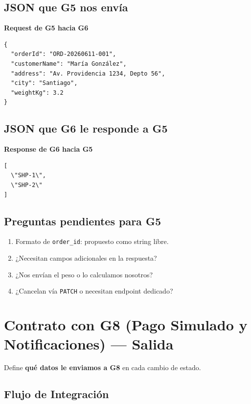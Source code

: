 \documentclass[11pt, a4paper]{article}
\newcommand{\contractheader}[1]{%
  \noindent\colorbox{primary!10}{%
    \parbox{\dimexpr\textwidth-2\fboxsep}{%
      \textbf{\faFileCode\quad #1}%
    }%
  }
  \vspace{0.3cm}
}
\begin{document}
\subsection{JSON que G5 nos envía}

\contractheader{Request de G5 hacia G6}

\begin{lstlisting}
{
  "orderId": "ORD-20260611-001",
  "customerName": "María González",
  "address": "Av. Providencia 1234, Depto 56",
  "city": "Santiago",
  "weightKg": 3.2
}
\end{lstlisting}

\subsection{JSON que G6 le responde a G5}

\contractheader{Response de G6 hacia G5}

\begin{lstlisting}
[
  \"SHP-1\",
  \"SHP-2\"
]
\end{lstlisting}

\subsection{Preguntas pendientes para G5}

\begin{warningbox}[title={\faExclamationCircle\quad Confirmar con G5}]
\begin{enumerate}[noitemsep]
  \item Formato de \texttt{order\_id}: propuesto como string libre.
  \item ¿Necesitan campos adicionales en la respuesta?
  \item ¿Nos envían el peso o lo calculamos nosotros?
  \item ¿Cancelan vía \texttt{PATCH} o necesitan endpoint dedicado?
\end{enumerate}
\end{warningbox}


\section{Contrato con G8 (Pago Simulado y Notificaciones) --- Salida}
\label{sec:contrato-g8}

Define \textbf{qué datos le enviamos a G8} en cada cambio de estado.

\subsection{Flujo de Integración}
\end{document}
